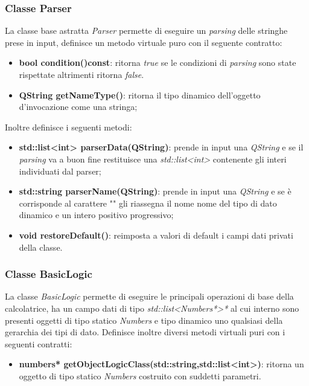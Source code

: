 \documentclass[a4paper,10pt]{article}
\begin{document}
        \subsubsection{Classe Parser}
        La classe base astratta \textit{Parser} permette di eseguire un \textit{parsing} delle stringhe prese in input, definisce un metodo virtuale puro con il seguente contratto:
        \begin{itemize}
            \item \textbf{bool condition()const}: ritorna \textit{true} se le condizioni di \textit{parsing} sono state rispettate altrimenti ritorna \textit{false}.
            \item \textbf{QString getNameType()}: ritorna il tipo dinamico dell'oggetto d'invocazione come una stringa;
        \end{itemize}
        Inoltre definisce i seguenti metodi:
        \begin{itemize}
            \item \textbf{std::list<int> parserData(QString)}: prende in input una \textit{QString} e se il \textit{parsing} va a buon fine restituisce una \textit{std::list<int>} contenente gli interi individuati dal parser;
            \item \textbf{std::string parserName(QString)}: prende in input una \textit{QString} e se è corrisponde al carattere "" gli riassegna il nome nome del tipo di dato dinamico e un intero positivo progressivo;
            \item \textbf{void restoreDefault()}: reimposta a valori di default i campi dati privati della classe.
        \end{itemize}
            
        \subsubsection{Classe BasicLogic}
        La classe \textit{BasicLogic} permette di eseguire le principali operazioni di base della calcolatrice, ha un campo dati di tipo \textit{std::list<Numbers*>*} al cui interno sono presenti oggetti di tipo statico \textit{Numbers} e tipo dinamico uno qualsiasi della gerarchia dei tipi di dato.
        Definisce inoltre diversi metodi virtuali puri con i seguenti contratti:
        \begin{itemize}
            \item \textbf{numbers* getObjectLogicClass(std::string,std::list<int>)}: ritorna un oggetto di tipo statico \textit{Numbers} costruito con suddetti parametri.
        \end{itemize}
\end{document}

